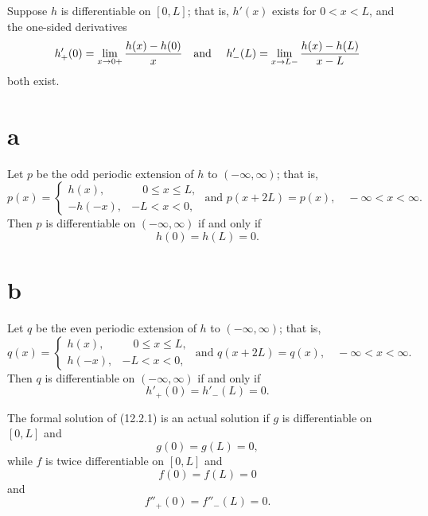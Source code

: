\setcounter{theorem}{2}
\setcounter{equation}{12}
\begin{theorem}
  \label{thmtype:12.2.3} Suppose $h$ is differentiable on $[0,L]$; that is, $h'(x)$ exists for
  $0<x<L$, and the one-sided derivatives
  \[
    h'_{+}(0)=\lim_{x\to0+}\frac{h(x)-h(0)}{x}\mbox{\quad and \quad}h'_{-}(L)=\lim_{x\to L-}\frac{h(x)-h(L)}{x-L}
  \]
  both exist.

\part{a} Let $p$ be the odd periodic extension of $h$ to $(-\infty,\infty)$; that is,
  \[
    p(x)= \left\{
    \begin{array}{cl}
      h(x),   & \quad0\le x\le L, \\
      -h(-x), & -L<x<0,
    \end{array}\right. \mbox{\  and\  }p(x+2L)=p(x),\quad-\infty<x<\infty.
  \]
  Then $p$ is differentiable on $(-\infty,\infty)$ if and only if
  \begin{equation}
    \label{eq:12.2.13}h(0)=h(L)=0.
  \end{equation}

\part{b} Let $q$ be the even periodic extension of $h$ to $(-\infty,\infty)$; that is,
  \[
    q(x)= \left\{
    \begin{array}{cl}
      h(x),  & \quad0\le x\le L, \\
      h(-x), & -L<x<0,
    \end{array}\right. \mbox{\  and\  }q(x+2L)=q(x),\quad-\infty<x<\infty.
  \]
  Then $q$ is differentiable on $(-\infty,\infty)$ if and only if
  \begin{equation}
    \label{eq:12.2.14}h'_{+}(0)=h'_{-}(L)=0.
  \end{equation}
\end{theorem}

\setcounter{theorem}{3}
\setcounter{equation}{14}
\begin{theorem}
  \label{thmtype:12.2.4} The formal solution of \textup{(12.2.1)} is an actual solution if $g$ is
  differentiable on $[0,L]$ and
  \begin{equation}
    \label{eq:12.2.15}g(0)=g(L)=0,
  \end{equation}
  while $f$ is twice differentiable on $[0,L]$ and
  \begin{equation}
    \label{eq:12.2.16}f(0)=f(L)=0
  \end{equation}
  and
  \begin{equation}
    \label{eq:12.2.17}f''_{+}(0)=f''_{-}(L)=0.
  \end{equation}
\end{theorem}

